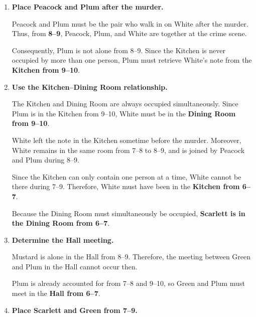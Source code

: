 \begin{tcolorbox}
\begin{enumerate}[
    leftmargin=*,
    itemsep=1pt,
    topsep=2pt,
    parsep=0pt,
    partopsep=0pt
]
\begin{itemize}[leftmargin=*, itemsep=2pt]
        \item Scarlett and Green are together from 7--9,
        so neither can be the culprit, since the culprit is alone
        immediately before the murder at 8.

        \item Peacock and Plum are together from 7--8,
        so neither can be the culprit.
    \end{itemize}

    Therefore, the culprit must be
    \textbf{Mrs. White}.

    \item \textbf{Place Peacock and Plum after the murder.}

    Peacock and Plum must be the pair who walk in on White after
    the murder. Thus, from \textbf{8--9}, Peacock, Plum, and White
    are together at the crime scene.

    Consequently, Plum is not alone from 8--9.
    Since the Kitchen is never occupied by more than one person,
    Plum must retrieve White's note from the
    \textbf{Kitchen from 9--10}.

    \item \textbf{Use the Kitchen--Dining Room relationship.}

    The Kitchen and Dining Room are always occupied simultaneously.
    Since Plum is in the Kitchen from 9--10,
    White must be in the
    \textbf{Dining Room from 9--10}.

    White left the note in the Kitchen sometime before the murder.
    Moreover, White remains in the same room from 7--8 to 8--9,
    and is joined by Peacock and Plum during 8--9.

    Since the Kitchen can only contain one person at a time,
    White cannot be there during 7--9.
    Therefore, White must have been in the
    \textbf{Kitchen from 6--7}.

    Because the Dining Room must simultaneously be occupied,
    \textbf{Scarlett is in the Dining Room from 6--7}.

    \item \textbf{Determine the Hall meeting.}

    Mustard is alone in the Hall from 8--9.
    Therefore, the meeting between Green and Plum in the Hall
    cannot occur then.

    Plum is already accounted for from 7--8 and 9--10,
    so Green and Plum must meet in the
    \textbf{Hall from 6--7}.

    \item \textbf{Place Scarlett and Green from 7--9.}


\end{enumerate}
\end{tcolorbox}
